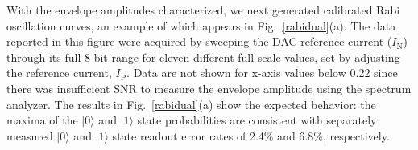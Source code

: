 \documentclass[journal]{IEEEtran}
\newcommand{\CR}[1]{{\color{black}#1}}
\begin{document}




\CR{With the envelope amplitudes characterized, we next generated calibrated Rabi oscillation curves, an example of which appears in Fig.~\ref{rabidual}(a).}  The data reported in this figure were acquired by  sweeping the DAC reference current ($I_\text{N}$) through \CR{its full 8-bit range} for eleven different \CR{full-scale values, set by adjusting the reference current, $I_\text{P}$}. Data \CR{are} not shown for x-axis values below 0.22 since there was insufficient SNR to measure the envelope amplitude using the spectrum analyzer. The results in Fig.\CR{~\ref{rabidual}(a)} show the expected behavior: the maxima of the $|0\rangle$ and $|1\rangle$ state probabilities are consistent with separately measured $|0\rangle$ and $|1\rangle$ state readout error rates of 2.4\% and 6.8\%, respectively.
\end{document}
